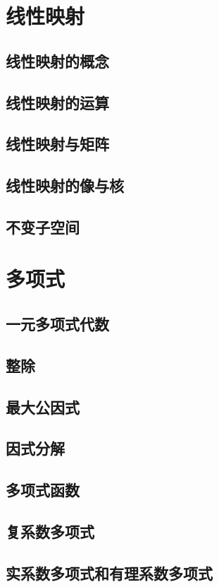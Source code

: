 \documentclass[a4paper, 11pt]{ctexbook}
\begin{document}
    \chapter{线性映射}
        \section{线性映射的概念}
        \section{线性映射的运算}
        \section{线性映射与矩阵}
        \section{线性映射的像与核}
        \section{不变子空间}
    \chapter{多项式}
        \section{一元多项式代数}
        \section{整除}
        \section{最大公因式}
        \section{因式分解}
        \section{多项式函数}
        \section{复系数多项式}
        \section{实系数多项式和有理系数多项式}
\end{document}
